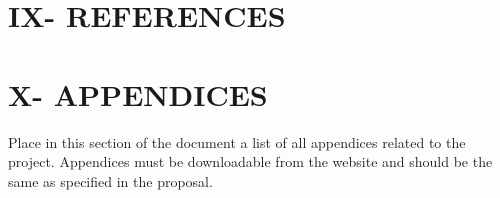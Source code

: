 \documentclass[12pt,oneside,letterpaper]{report}
\begin{document}


\newpage

\thispagestyle{empty}
\mbox{}
\newpage


\newpage

\thispagestyle{empty}
\mbox{}
\newpage


\newpage


\newpage


\newpage

\setcounter{page}{6}
\renewcommand{\contentsname}{CONTENT}
\tableofcontents
\newpage


\newpage












\chapter*{IX- REFERENCES}
\printbibliography[heading=none]

\chapter*{X- APPENDICES}

Place in this section of the document a list of all appendices related to the project. Appendices must be downloadable from the website and should be the same as specified in the proposal.
\end{document}
